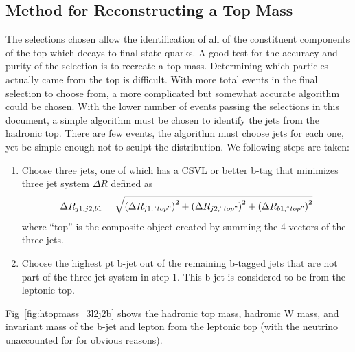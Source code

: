 	\subsection{Method for Reconstructing a Top Mass}
	The selections chosen allow the identification of all of the constituent components of the top which decays to final state quarks. A good test for the accuracy and purity of the selection is to recreate a top mass. Determining which  particles actually came from the top is difficult. With more total events in the final selection to choose from, a more complicated but somewhat accurate algorithm could be chosen. With the lower number of events passing the selections in this document, a simple algorithm must be chosen to identify the jets from the hadronic top. There are few events, the algorithm must choose jets for each one, yet be simple enough not to sculpt the distribution. We following steps are taken:
\begin{enumerate}
\item Choose three jets, one of which has a CSVL or better b-tag that minimizes three jet system $\Delta R$ defined as
\begin{equation}
\Delta R_{j1,j2,b1} = \sqrt{ \left(\Delta R_{j1, ``top"} \right) ^2 + \left(\Delta R_{j2, ``top"} \right) ^2 + \left(\Delta R_{b1, ``top"} \right) ^2 }
\end{equation}
where ``top'' is the composite object created by summing the 4-vectors of the three jets.
\item Choose the highest pt b-jet out of the remaining b-tagged jets that are not part of the three jet system in step 1. This b-jet is considered to be from the leptonic top.
\end{enumerate}

Fig~\ref{fig:htopmass_3l2j2b} shows the hadronic top mass, hadronic W mass, and invariant mass of the b-jet and lepton from the leptonic top (with the neutrino unaccounted for for obvious reasons).


